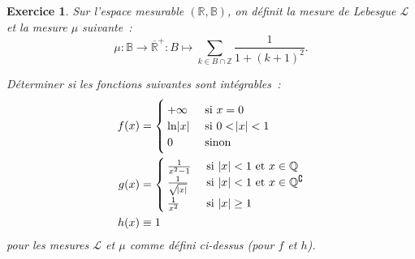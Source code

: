 \documentclass{article}
\newtheorem{ex}{Exercice}[section]
\newcommand{\pinfty}{{+\infty}}
\newcommand{\C}{\complement}
\newcommand{\Z}{{\mathbb Z}}
\newcommand{\Q}{{\mathbb Q}}
\newcommand{\R}{{\mathbb R}}
\newcommand{\B}{{\mathbb B}}
\begin{document}
\begin{ex} Sur l'espace mesurable $(\R, \B)$, on définit la mesure de Lebesgue $\mathcal L$ et la mesure $\mu$ suivante~:
\[\mu : \B \to \overline \R^+ : B \mapsto \sum_{k \in B \cap \Z}\frac 1{1 + (k+1)^2}.\]

Déterminer si les fonctions suivantes sont intégrables~:
\begin{align*}
	f(x) &=
	\begin{cases}
		\pinfty &\text{ si } x=0 \\
		\ln\abs x & \text{ si } 0 < \abs x < 1 \\
		0 &\text{ sinon}
	\end{cases} \\
	g(x) &=
	\begin{cases}
		\frac 1{x^2-1} &\text{ si } \abs x < 1 \text{ et } x \in \Q \\
		\frac 1{\sqrt {\abs x}} &\text{ si } \abs x < 1 \text{ et } x \in \Q^\C\\
		\frac 1{x^2} & \text{ si }\abs x \geq 1
	\end{cases} \\
	h(x) &\equiv 1
\end{align*}
pour les mesures $\mathcal L$ et $\mu$ comme défini ci-dessus (pour $f$ et $h$).
\end{ex}
\end{document}
